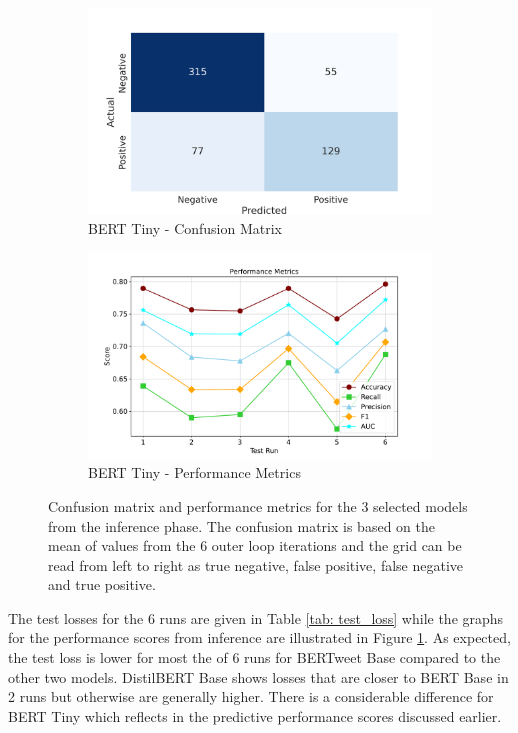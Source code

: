 \begin{figure}[!ht]
    \begin{subfigure}{0.45\linewidth}
        \includegraphics[width=\linewidth]{figures/confusion_berttiny.png}
        \caption{BERT Tiny - Confusion Matrix}
    \end{subfigure}
    \hfil
    \begin{subfigure}{0.45\linewidth}
        \includegraphics[width=\linewidth]{figures/metrics_line_berrttiny.pdf}
        \caption{BERT Tiny - Performance Metrics}
    \end{subfigure}
    \caption{Confusion matrix and performance metrics for the 3 selected models from the inference phase. The confusion matrix is based on the mean of values from the 6 outer loop iterations and the grid can be read from left to right as true negative, false positive, false negative and true positive.}
    \label{fig: deep_dive_results}
\end{figure}

The test losses for the 6 runs are given in Table \ref{tab: test_loss} while the graphs for the performance scores from inference are illustrated in Figure \ref{fig: deep_dive_results}. As expected, the test loss is lower for most the of 6 runs for BERTweet Base compared to the other two models. DistilBERT Base shows losses that are closer to BERT Base in 2 runs but otherwise are generally higher. There is a considerable difference for BERT Tiny which reflects in the predictive performance scores discussed earlier.\\

